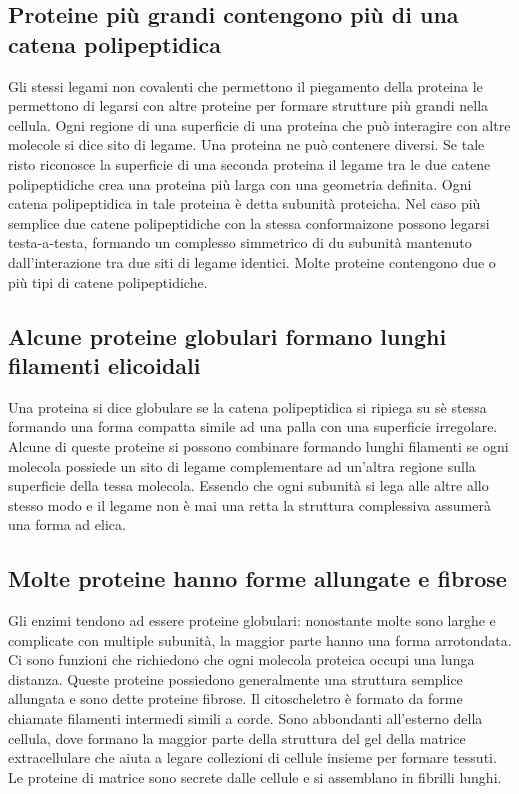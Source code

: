 \subsection{Proteine pi\`u grandi contengono pi\`u di una catena polipeptidica}
Gli stessi legami non covalenti che permettono il piegamento della proteina le permettono di legarsi con altre proteine per formare strutture pi\`u grandi nella cellula. Ogni regione di
una superficie di una proteina che pu\`o interagire con altre molecole si dice sito di legame. Una proteina ne pu\`o contenere diversi. Se tale risto riconosce la superficie di una 
seconda proteina il legame tra le due catene polipeptidiche crea una proteina pi\`u larga con una geometria definita. Ogni catena polipeptidica in tale proteina \`e detta subunit\`a 
proteicha. Nel caso pi\`u semplice due catene polipeptidiche con la stessa conformaizone possono legarsi testa-a-testa, formando un complesso simmetrico di du subunit\`a mantenuto 
dall'interazione tra due siti di legame identici. Molte proteine contengono due o pi\`u tipi di catene polipeptidiche.
\subsection{Alcune proteine globulari formano lunghi filamenti elicoidali}
Una proteina si dice globulare se la catena polipeptidica si ripiega su s\`e stessa formando una forma compatta simile ad una palla con una superficie irregolare. Alcune di queste 
proteine si possono combinare formando lunghi filamenti se ogni molecola possiede un sito di legame complementare ad un'altra regione sulla superficie della tessa molecola. Essendo che
ogni subunit\`a si lega alle altre allo stesso modo e il legame non \`e mai una retta la struttura complessiva assumer\`a una forma ad elica. 
\subsection{Molte proteine hanno forme allungate e fibrose}
Gli enzimi tendono ad essere proteine globulari: nonostante molte sono larghe e complicate con multiple subunit\`a, la maggior parte hanno una forma arrotondata. Ci sono funzioni che
richiedono che ogni molecola proteica occupi una lunga distanza. Queste proteine possiedono generalmente una struttura semplice allungata e sono dette proteine fibrose. Il citoscheletro
\`e formato da forme chiamate filamenti intermedi simili a corde. Sono abbondanti all'esterno della cellula, dove formano la maggior parte della struttura del gel della matrice
extracellulare che aiuta  a legare collezioni di cellule insieme per formare tessuti. Le proteine di matrice sono secrete dalle cellule e si assemblano in fibrilli lunghi.
